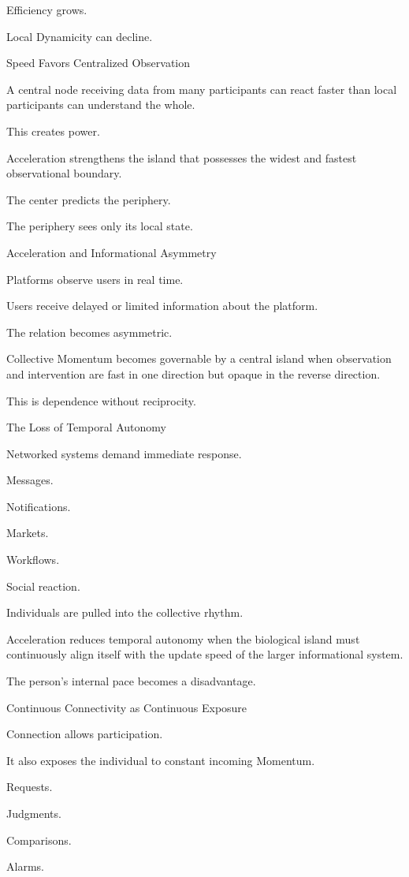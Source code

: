 Efficiency grows.

Local Dynamicity can decline.

Speed Favors Centralized Observation

A central node receiving data from many participants can react faster than local participants can understand the whole.

This creates power.

Acceleration strengthens the island that possesses the widest and fastest observational boundary.

The center predicts the periphery.

The periphery sees only its local state.

Acceleration and Informational Asymmetry

Platforms observe users in real time.

Users receive delayed or limited information about the platform.

The relation becomes asymmetric.

Collective Momentum becomes governable by a central island when observation and intervention are fast in one direction but opaque in the reverse direction.

This is dependence without reciprocity.

The Loss of Temporal Autonomy

Networked systems demand immediate response.

Messages.

Notifications.

Markets.

Workflows.

Social reaction.

Individuals are pulled into the collective rhythm.

Acceleration reduces temporal autonomy when the biological island must continuously align itself with the update speed of the larger informational system.

The person’s internal pace becomes a disadvantage.

Continuous Connectivity as Continuous Exposure

Connection allows participation.

It also exposes the individual to constant incoming Momentum.

Requests.

Judgments.

Comparisons.

Alarms.

